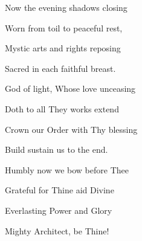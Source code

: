 \noindent
\begin{minipage}[t]{0.30\textwidth}
\small
Now the evening shadows closing\par
Worn from toil to peaceful rest,\par
Mystic arts and rights reposing\par
Sacred in each faithful breast.
\end{minipage}\hspace{0.05\textwidth}%
\begin{minipage}[t]{0.30\textwidth}
\small
God of light, Whose love unceasing\par
Doth to all They works extend\par
Crown our Order with Thy blessing\par
Build sustain us to the end.
\end{minipage}\hspace{0.05\textwidth}%
\begin{minipage}[t]{0.30\textwidth}
\small
Humbly now we bow before Thee\par
Grateful for Thine aid Divine\;\par
Everlasting Power and Glory\par
Mighty Architect, be Thine!
\end{minipage}
